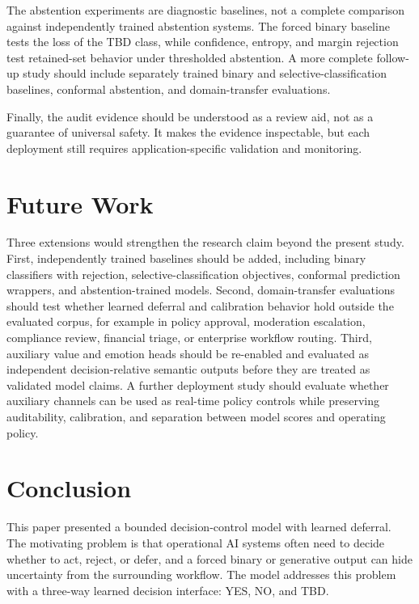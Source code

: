 \documentclass[11pt]{article}
\begin{document}
The abstention experiments are diagnostic baselines, not a complete comparison against independently trained abstention systems. The forced binary baseline tests the loss of the TBD class, while confidence, entropy, and margin rejection test retained-set behavior under thresholded abstention. A more complete follow-up study should include separately trained binary and selective-classification baselines, conformal abstention, and domain-transfer evaluations.

Finally, the audit evidence should be understood as a review aid, not as a guarantee of universal safety. It makes the evidence inspectable, but each deployment still requires application-specific validation and monitoring.

\section{Future Work}

Three extensions would strengthen the research claim beyond the present study. First, independently trained baselines should be added, including binary classifiers with rejection, selective-classification objectives, conformal prediction wrappers, and abstention-trained models. Second, domain-transfer evaluations should test whether learned deferral and calibration behavior hold outside the evaluated corpus, for example in policy approval, moderation escalation, compliance review, financial triage, or enterprise workflow routing. Third, auxiliary value and emotion heads should be re-enabled and evaluated as independent decision-relative semantic outputs before they are treated as validated model claims. A further deployment study should evaluate whether auxiliary channels can be used as real-time policy controls while preserving auditability, calibration, and separation between model scores and operating policy.

\section{Conclusion}

This paper presented a bounded decision-control model with learned deferral. The motivating problem is that operational AI systems often need to decide whether to act, reject, or defer, and a forced binary or generative output can hide uncertainty from the surrounding workflow. The model addresses this problem with a three-way learned decision interface: YES, NO, and TBD.
\end{document}
